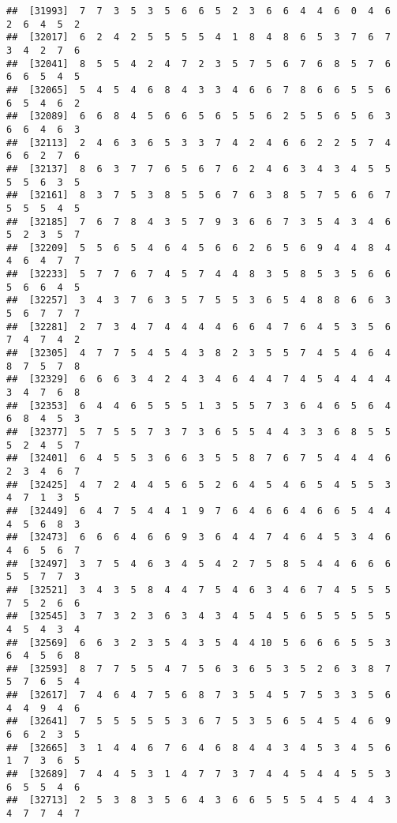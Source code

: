 \documentclass[
]{book}
\begin{document}
\begin{verbatim}
##  [31993]  7  7  3  5  3  5  6  6  5  2  3  6  6  4  4  6  0  4  6  2  6  4  5  2
##  [32017]  6  2  4  2  5  5  5  5  4  1  8  4  8  6  5  3  7  6  7  3  4  2  7  6
##  [32041]  8  5  5  4  2  4  7  2  3  5  7  5  6  7  6  8  5  7  6  6  6  5  4  5
##  [32065]  5  4  5  4  6  8  4  3  3  4  6  6  7  8  6  6  5  5  6  6  5  4  6  2
##  [32089]  6  6  8  4  5  6  6  5  6  5  5  6  2  5  5  6  5  6  3  6  6  4  6  3
##  [32113]  2  4  6  3  6  5  3  3  7  4  2  4  6  6  2  2  5  7  4  6  6  2  7  6
##  [32137]  8  6  3  7  7  6  5  6  7  6  2  4  6  3  4  3  4  5  5  5  5  6  3  5
##  [32161]  8  3  7  5  3  8  5  5  6  7  6  3  8  5  7  5  6  6  7  5  5  5  4  5
##  [32185]  7  6  7  8  4  3  5  7  9  3  6  6  7  3  5  4  3  4  6  5  2  3  5  7
##  [32209]  5  5  6  5  4  6  4  5  6  6  2  6  5  6  9  4  4  8  4  4  6  4  7  7
##  [32233]  5  7  7  6  7  4  5  7  4  4  8  3  5  8  5  3  5  6  6  5  6  6  4  5
##  [32257]  3  4  3  7  6  3  5  7  5  5  3  6  5  4  8  8  6  6  3  5  6  7  7  7
##  [32281]  2  7  3  4  7  4  4  4  4  6  6  4  7  6  4  5  3  5  6  7  4  7  4  2
##  [32305]  4  7  7  5  4  5  4  3  8  2  3  5  5  7  4  5  4  6  4  8  7  5  7  8
##  [32329]  6  6  6  3  4  2  4  3  4  6  4  4  7  4  5  4  4  4  4  3  4  7  6  8
##  [32353]  6  4  4  6  5  5  5  1  3  5  5  7  3  6  4  6  5  6  4  6  8  4  5  3
##  [32377]  5  7  5  5  7  3  7  3  6  5  5  4  4  3  3  6  8  5  5  5  2  4  5  7
##  [32401]  6  4  5  5  3  6  6  3  5  5  8  7  6  7  5  4  4  4  6  2  3  4  6  7
##  [32425]  4  7  2  4  4  5  6  5  2  6  4  5  4  6  5  4  5  5  3  4  7  1  3  5
##  [32449]  6  4  7  5  4  4  1  9  7  6  4  6  6  4  6  6  5  4  4  4  5  6  8  3
##  [32473]  6  6  6  4  6  6  9  3  6  4  4  7  4  6  4  5  3  4  6  4  6  5  6  7
##  [32497]  3  7  5  4  6  3  4  5  4  2  7  5  8  5  4  4  6  6  6  5  5  7  7  3
##  [32521]  3  4  3  5  8  4  4  7  5  4  6  3  4  6  7  4  5  5  5  7  5  2  6  6
##  [32545]  3  7  3  2  3  6  3  4  3  4  5  4  5  6  5  5  5  5  5  4  5  4  3  4
##  [32569]  6  6  3  2  3  5  4  3  5  4  4 10  5  6  6  6  5  5  3  6  4  5  6  8
##  [32593]  8  7  7  5  5  4  7  5  6  3  6  5  3  5  2  6  3  8  7  5  7  6  5  4
##  [32617]  7  4  6  4  7  5  6  8  7  3  5  4  5  7  5  3  3  5  6  4  4  9  4  6
##  [32641]  7  5  5  5  5  5  3  6  7  5  3  5  6  5  4  5  4  6  9  6  6  2  3  5
##  [32665]  3  1  4  4  6  7  6  4  6  8  4  4  3  4  5  3  4  5  6  1  7  3  6  5
##  [32689]  7  4  4  5  3  1  4  7  7  3  7  4  4  5  4  4  5  5  3  6  5  5  4  6
##  [32713]  2  5  3  8  3  5  6  4  3  6  6  5  5  5  4  5  4  4  3  4  7  7  4  7

\end{verbatim}
\end{document}
